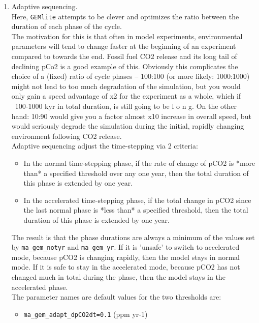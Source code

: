 \documentclass[11pt,fleqn]{book} %
\begin{document}
\begin{enumerate}
\vspace{1mm}
        \item Adaptive sequencing.
        \\Here, \texttt{GEMlite} attempts to be clever and optimizes the ratio between the duration of each phase of the cycle.
        \\The motivation for this is that often in model experiments, environmental parameters will  tend to change faster at the beginning of an experiment compared to towards the end. Fossil fuel CO2 release and its long tail of declining pCo2 is a good example of this. Obviously this complicates the choice of a (fixed) ratio of cycle phases -- 100:100 (or more likely: 1000:1000) might not lead to too much degradation of the simulation, but you would only gain a speed advantage of x2 for the experiment as a whole, which if ~100-1000 kyr in total duration, is still going to be l o n g. On the other hand: 10:90 would give you a factor almost x10 increase in overall speed, but would seriously degrade the simulation during the initial, rapidly changing environment following CO2 release.
        \\Adaptive sequencing adjust the time-stepping via 2 criteria:
\begin{itemize}
\vspace{1mm}
        \item In the normal time-stepping phase, if the rate of change of pCO2 is *more than* a specified threshold over any one year, then the total duration of this phase is extended by one year.
\vspace{1mm}
        \item In the accelerated time-stepping phase, if the total change in pCO2 since the last normal phase is *less than* a specified threshold, then the total duration of this phase is extended by one year.
\end{itemize}
The result is that the phase durations are always a minimum of the values set by \texttt{ma\_gem\_notyr} and \texttt{ma\_gem\_yr}. If it is 'unsafe' to switch to accelerated mode, because pCO2 is changing rapidly, then the model stays in normal mode. If it is safe to stay in the accelerated mode, because pCO2 has not changed much in total during the phase, then the model stays in the accelerated phase.
        \\The parameter names are default values for the two thresholds are:
\begin{itemize}
\vspace{1mm}
        \item \texttt{ma\_gem\_adapt\_dpCO2dt=0.1} (ppm yr-1)

\end{itemize}
\end{enumerate}
\end{document}
